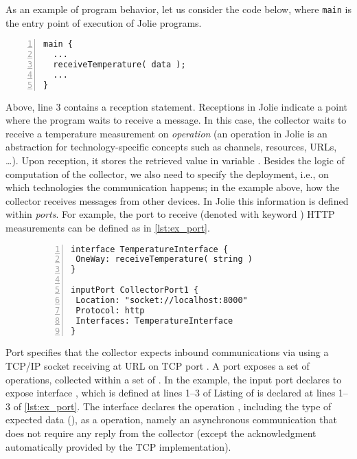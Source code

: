 As an example of program behavior, let us consider the code below, where
\lstinline{main} is the entry point of execution of Jolie programs.
%
\begin{lstlisting}[numbers=left,basicstyle=\footnotesize\ttfamily]
main {
  ...
  receiveTemperature( data );
  ...
}
\end{lstlisting}
%
Above, line 3 contains a reception statement. Receptions in Jolie indicate a
point where the program waits to receive a message. In this case, the collector
waits to receive a temperature measurement on \emph{operation}
 (an operation in Jolie is an abstraction for
technology-specific concepts such as channels, resources, URLs, \dots). Upon
reception, it stores the retrieved value in variable .
%
Besides the logic of computation of the collector, we also need to specify the
deployment, i.e., on which technologies the communication happens; in the
example above, how the collector receives messages from other devices. In Jolie
this information is defined within \emph{ports}. For example, the port to
receive (denoted with keyword ) HTTP measurements can be defined
as in \cref{lst:ex_port}.
%
\begin{figure}
 \begin{lstlisting}[numbers=left,basicstyle=\ttfamily\footnotesize,caption=Example of interface
and input port in Jolie.,label=lst:ex_port]
interface TemperatureInterface {
 OneWay: receiveTemperature( string )
}

inputPort CollectorPort1 {
 Location: "socket://localhost:8000"
 Protocol: http
 Interfaces: TemperatureInterface
}
\end{lstlisting}
\end{figure}
%
Port  specifies that the collector expects inbound
communications via   using a TCP/IP socket receiving
at URL  on TCP port . A port exposes a set of
operations, collected within a set of . In the example, the
input port  declares to expose interface
, which is defined at lines 1--3 of Listing of
 is declared at lines 1--3 of \cref{lst:ex_port}. The interface
declares the operation , including the type of expected
data (), as a  operation, namely an asynchronous
communication that does not require any reply from the collector (except the
acknowledgment automatically provided by the TCP implementation).

